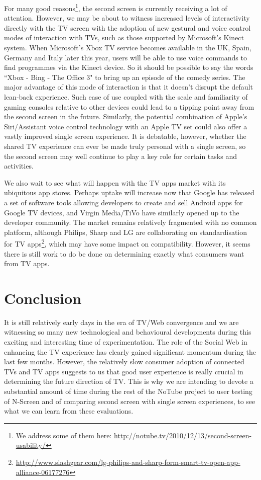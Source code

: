 \documentclass{notube}
\begin{document}
For many good reasons\footnote{We address some of them here: \url{http://notube.tv/2010/12/13/second-screen-usability/}}, the second screen is currently receiving a lot of attention. However, we may be about to witness increased levels of interactivity directly with the TV screen with the adoption of new gestural and voice control modes of interaction with TVs, such as those supported by Microsoft's Kinect system. When Microsoft's Xbox TV service becomes available in the UK, Spain, Germany and Italy later this year, users will be able to use voice commands to find programmes via the Kinect device. So it should be possible to say the words ``Xbox - Bing - The Office 3" to bring up an episode of the comedy series. The major advantage of this mode of interaction is that it doesn't disrupt the default lean-back experience. Such ease of use coupled with the scale and familiarity of gaming consoles relative to other devices could lead to a tipping point away from the second screen in the future. Similarly, the potential combination of Apple's  Siri/Assistant voice control technology with an Apple TV set could also offer a vastly improved single screen experience. It is debatable, however, whether the shared TV experience can ever be made truly personal with a single screen, so the second screen may well continue to play a key role for certain tasks and activities.

We also wait to see what will happen with the TV apps market with its ubiquitous app stores. Perhaps uptake will increase now that Google has released a set of software tools allowing developers to create and sell Android apps for Google TV devices, and Virgin Media/TiVo have similarly opened up to the developer community. The market remains relatively fragmented with no common platform, although Philips, Sharp and LG are collaborating on standardisation for TV apps\footnote{\url{http://www.slashgear.com/lg-philips-and-sharp-form-smart-tv-open-app-alliance-06177276}}, which may have some impact on compatibility. However, it seems there is still work to do be done on determining exactly what consumers want from TV apps. 

\chapter{Conclusion}

It is still relatively early days in the era of TV/Web convergence and we are witnessing so many new technological and behavioural developments during this exciting and interesting time of experimentation. The role of the Social Web in enhancing the TV experience has clearly gained significant momentum during the last few months. However, the relatively slow consumer adoption of connected TVs and TV apps suggests to us that good user experience is really crucial in determining the future direction of TV. This is why we are intending to devote a substantial amount of time during the rest of the NoTube project to user testing of N-Screen and of comparing second screen with single screen experiences, to see what we can learn from these evaluations.
\end{document}

